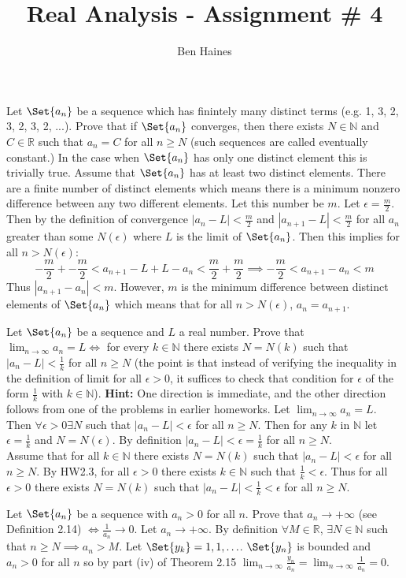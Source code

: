 \documentclass[paper=a4, fontsize=11pt]{jhwhw} %
\begin{document}
\title{Real Analysis - Assignment \# 4}
\author{Ben Haines}

Let $\Set{a_n}$ be a sequence which has finintely many distinct terms (e.g. 1, 3, 2, 3, 2, 3, 2, ...). Prove that if $\Set{a_n}$ converges, then there exists $N\in \mathbb N$ and $C\in \mathbb R$ such that $a_n = C$ for all $n\ge N$ (such sequences are called eventually constant.)
\solution
In the case when $\Set{a_n}$ has only one distinct element this is trivially true. Assume that $\Set{a_n}$ has at least two distinct elements. There are a finite number of distinct elements which means there is a minimum nonzero difference between any two different elements. Let this number be $m$. Let $\epsilon = \frac{m}{2}$. Then by the definition of convergence $|a_n - L| < \frac{m}{2}$ and $|a_{n+1} - L| < \frac{m}{2}$ for all $a_n$ greater than some $N(\epsilon)$ where $L$ is the limit of $\Set{a_n}$. Then this implies for all $n > N(\epsilon)$:
$$-\frac{m}{2} + -\frac{m}{2} < a_{n+1} - L + L - a_{n} < \frac{m}{2} + \frac{m}{2} \implies -\frac{m}{2} < a_{n+1} - a_n < m$$
Thus $|a_{n+1} - a_n| < m$. However, $m$ is the minimum difference between distinct elements of $\Set{a_n}$ which means that for all $n > N(\epsilon)$, $a_n = a_{n+1}$. 

Let $\Set{a_n}$ be a sequence and $L$ a real number. Prove that $\lim_{n\to\infty}a_n = L \iff$ for every $k\in \mathbb N$ there exists $N = N(k)$ such that $|a_n - L| < \frac{1}{k}$ for all $n\ge N$ (the point is that instead of verifying the inequality in the definition of limit for all $\epsilon > 0$, it suffices to check that condition for $\epsilon $ of the form $\frac{1}{k}$ with $k\in \mathbb N$). \textbf{Hint:} One direction is immediate, and the other direction follows from one of the problems in earlier homeworks.
\solution
Let $\lim_{n\to \infty}a_n = L$. Then $\forall \epsilon > 0 \exists N$ such that $|a_n - L| < \epsilon $ for all $n \ge N$. Then for any $k$ in $\mathbb N$ let $\epsilon = \frac{1}{k}$ and $N = N(\epsilon)$. By definition $|a_n - L| < \epsilon = \frac{1}{k}$ for all $n \ge N$. \\

Assume that for all $k\in \mathbb N$ there exists $N = N(k)$ such that $|a_n - L| < \epsilon $ for all $n \ge N$. By HW2.3, for all $\epsilon > 0$ there exists $k\in \mathbb N$ such that $\frac{1}{k} < \epsilon $. Thus for all $\epsilon > 0$ there exists $N = N(k)$ such that $|a_n - L| < \frac{1}{k} < \epsilon $ for all $n \ge N$. 

Let $\Set{a_n}$ be a sequence with $a_n > 0$ for all $n$. Prove that $a_n \to +\infty$ (see Definition 2.14) $\iff \frac{1}{a_n} \to 0$.
\solution
Let $a_n \to +\infty$. By definition $\forall M\in \mathbb R$, $\exists N\in \mathbb N$ such that $n\ge N\implies a_n > M$. Let $\Set{y_k} = 1, 1, \ldots$. $\Set{y_n}$ is bounded and $a_n > 0$ for all $n$ so by part (iv) of Theorem 2.15 $\lim_{n\to \infty}\frac{y_n}{a_n} = \lim_{n\to \infty}\frac{1}{a_n} = 0$. 
\end{document}
